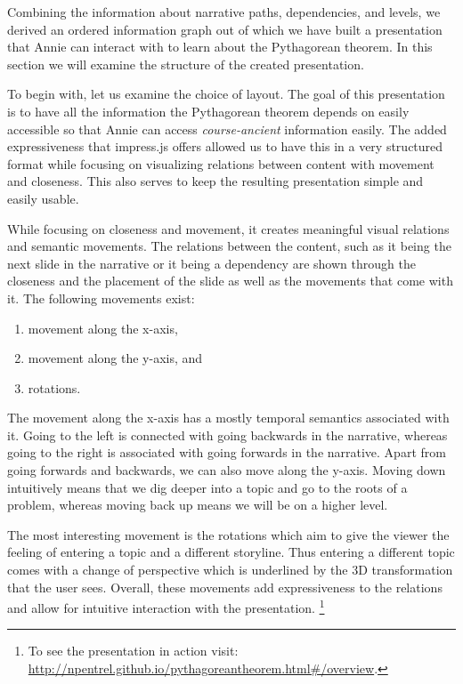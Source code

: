\documentclass{llncs}
\begin{document}
Combining the information about narrative paths, dependencies, and levels, we derived an ordered information graph out of which we have built a presentation that Annie can interact with to learn about the Pythagorean theorem. In this section we will examine the structure of the created presentation.

To begin with, let us examine the choice of layout. The goal of this presentation is to have all the information the Pythagorean theorem depends on easily accessible so that Annie can access \textit{course-ancient} information easily. The added expressiveness that impress.js offers allowed us to have this in a very structured format while focusing on visualizing relations between content with movement and closeness. This also serves to keep the resulting presentation simple and easily usable.

While focusing on closeness and movement, it creates meaningful visual relations and semantic movements. The relations between the content, such as it being the next slide in the narrative or it being a dependency are shown through the closeness and the placement of the slide as well as the movements that come with it. The following movements exist:
\vspace{-12pt}
\begin{enumerate}[topsep=0pt,itemsep=-1ex,partopsep=1ex,parsep=1ex]
\item movement along the x-axis,
\item movement along the y-axis, and
\item rotations.
\end{enumerate}
\vspace{5pt}

The movement along the x-axis has a mostly temporal semantics associated with it. Going to the left is connected with going backwards in the narrative, whereas going to the right is associated with going forwards in the narrative. Apart from going forwards and backwards, we can also move along the y-axis. Moving down intuitively means that we dig deeper into a topic and go to the roots of a problem, whereas moving back up means we will be on a higher level.

The most interesting movement is the rotations which aim to give the viewer the feeling of entering a topic and a different storyline. Thus entering a different topic comes with a change of perspective which is underlined by the 3D transformation that the user sees. Overall, these movements add expressiveness to the relations and allow for intuitive interaction with the presentation. \footnote{To see the presentation in action visit: \href{http://npentrel.github.io/pythagoreantheorem.html\#/overview}{http://npentrel.github.io/pythagoreantheorem.html\#/overview}.}
\end{document}
